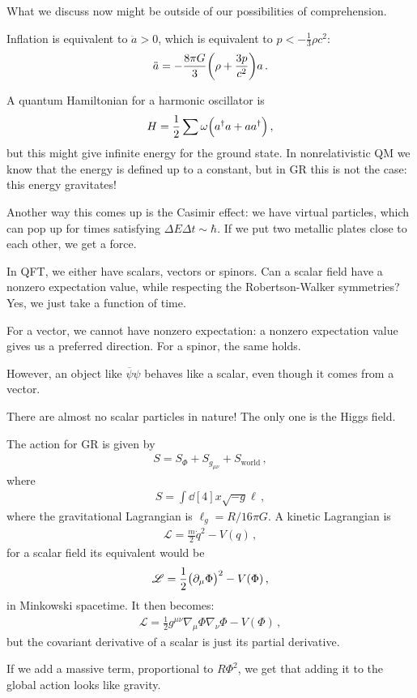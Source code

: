 \documentclass[main.tex]{subfiles}
\begin{document}
What we discuss now might be outside of our possibilities of comprehension.

Inflation is equivalent to \(\ddot{a} > 0 \), which is equivalent to \( p< -\frac{1}{3} \rho c^2\): 
%
\begin{align}
  \ddot{a} = - \frac{8 \pi G}{3} \qty(\rho + \frac{3 p}{c^2})a
\,.
\end{align}

A quantum Hamiltonian for a harmonic oscillator is 
%
\begin{align}
  H = \frac{1}{2} \sum \omega \qty(a ^\dag a + a a ^\dag)
\,,
\end{align}
%
but this might give infinite energy for the ground state.
In nonrelativistic QM we know that the energy is defined up to a constant, but in GR this is not the case: this energy gravitates!

Another way this comes up is the Casimir effect: we have virtual particles, which can pop up for times satisfying \(\Delta E \Delta t \sim \hbar\).
If we put two metallic plates close to each other, we get a force.

In QFT, we either have scalars, vectors or spinors.
Can a scalar field have a nonzero expectation value, while respecting the Robertson-Walker symmetries? Yes, we just take a function of time.

For a vector, we cannot have nonzero expectation: a nonzero expectation value gives us a preferred direction.
For a spinor, the same holds.

However, an object like \(\overline{\psi} \psi \) behaves like a scalar, even though it comes from a vector.

There are almost no scalar particles in nature! The only one is the Higgs field.

The action for GR is given by 
%
\begin{align}
  S = S_{\Phi } + S_{g_{\mu \nu }} + S_{\text{world}}
\,,
\end{align}
%
where 
%
\begin{align}
  S = \int \dd[4]{x} \sqrt{-g} \ell
\,,
\end{align}
%
where the gravitational Lagrangian is \(\ell_g = R /16 \pi G\).
A kinetic Lagrangian is  
%
\begin{align}
  \mathscr{L}  = \frac{m}{2} \dot{q}^2 - V(q)
\,,
\end{align}
%
for a scalar field its equivalent would be 
%
\begin{align}
  \mathscr{L} = \frac{1}{2} \qty(\partial_{\mu } \Phi )^2-V(\Phi )
\,,
\end{align}
%
in Minkowski spacetime. It then becomes: 
%
\begin{align}
  \mathscr{L} = \frac{1}{2} g^{\mu \nu } \nabla_{\mu } \Phi \nabla_{\nu } \Phi - V(\Phi )
\,,
\end{align}
%
but the covariant derivative of a scalar is just its partial derivative.

If we add a massive term, proportional to \(R \Phi^2\), we get that adding it to the global action looks like gravity.
\end{document}
